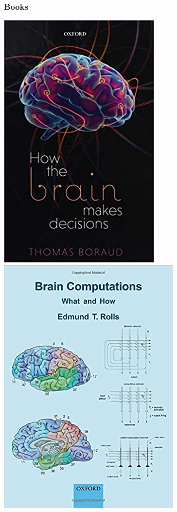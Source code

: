 \documentclass[16pt]{beamer}
\begin{document}
\begin{frame}
\frametitle{Books}
\centering
\includegraphics[scale=0.45]{How-the-Brain-Makes-Decisions_(cover).jpg}
\hspace*{2em}
\includegraphics[scale=0.45]{Brain-Computations_(cover).jpg}
\end{frame}
\end{document}
